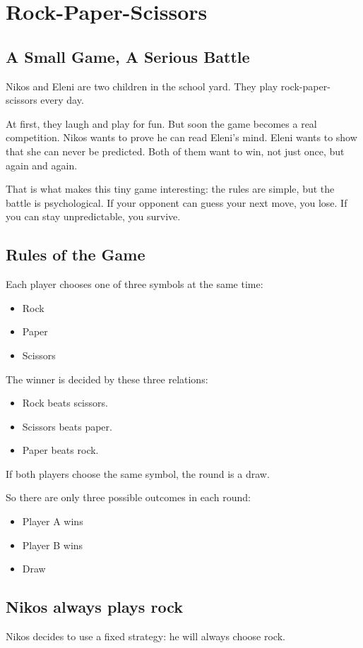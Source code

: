 \chapter{Rock-Paper-Scissors}

\section{A Small Game, A Serious Battle}
Nikos and Eleni are two children in the school yard. They play
rock-paper-scissors every day.

At first, they laugh and play for fun. But soon the game becomes a real
competition. Nikos wants to prove he can read Eleni's mind. Eleni wants to show
that she can never be predicted. Both of them want to win, not just once, but
again and again.

That is what makes this tiny game interesting: the rules are simple, but the
battle is psychological. If your opponent can guess your next move, you lose.
If you can stay unpredictable, you survive.

\section{Rules of the Game}
Each player chooses one of three symbols at the same time:
\begin{itemize}
  \item Rock
  \item Paper
  \item Scissors
\end{itemize}

The winner is decided by these three relations:
\begin{itemize}
  \item Rock beats scissors.
  \item Scissors beats paper.
  \item Paper beats rock.
\end{itemize}

If both players choose the same symbol, the round is a draw.

So there are only three possible outcomes in each round:
\begin{itemize}
  \item Player A wins
  \item Player B wins
  \item Draw
\end{itemize}

\section{Nikos always plays rock}
Nikos decides to use a fixed strategy: he will always choose rock.

